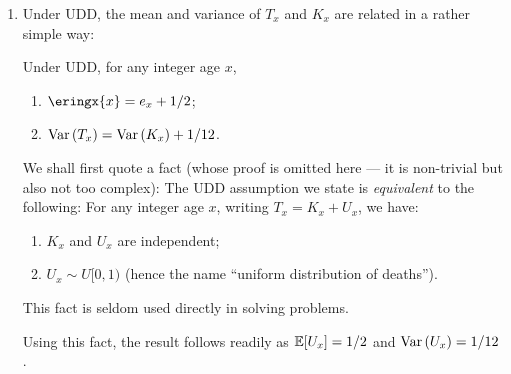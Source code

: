 \begin{enumerate}
\item Under UDD, the mean and variance of \(T_x\) and \(K_x\) are related in a rather simple way:
\begin{proposition}
Under UDD, for any integer age \(x\),
\begin{enumerate}
\item \(\eringx{x}=e_x+1/2\);
\item \(\operatorname{Var}\qty(T_x)=\operatorname{Var}\qty(K_x)+1/12\).
\end{enumerate}
\end{proposition}

\begin{pf}
We shall first quote a fact (whose proof is omitted here --- it is non-trivial
but also not too complex): The UDD assumption we state is \emph{equivalent} to
the following: For any integer age \(x\), writing
\(T_x=K_x+U_x\), we have:
\begin{enumerate}
\item \(K_x\) and \(U_x\) are independent;
\item \(U_x\sim U[0,1)\) (hence the name ``uniform distribution of deaths'').
\end{enumerate}
\begin{note}
This fact is seldom used directly in solving problems.
\end{note}
Using this fact, the result follows readily as \(\mathbb{E}\qty[U_x]=1/2\) and
\(\operatorname{Var}\qty(U_x)=1/12\).
\end{pf}


\end{enumerate}

